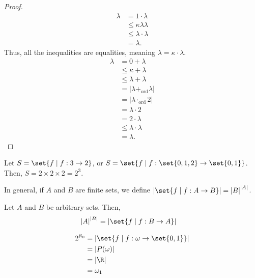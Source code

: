 \documentclass[10pt]{mypackage}
\begin{document}
\begin{proof}
  \begin{align*}
    \lambda &= 1\cdot \lambda\tag*{Needs proof.}\\
            &\leq \kappa\lambda \lambda\\
            &\leq \lambda\cdot \lambda\\
            &= \lambda.
  \end{align*}
  Thus, all the inequalities are equalities, meaning $\lambda = \kappa\cdot\lambda$.
  \begin{align*}
    \lambda &= 0 + \lambda\\
            &\leq \kappa + \lambda\\
            &\leq \lambda + \lambda\\
            &= \left\vert \lambda+_{\text{ord}} \lambda\right\vert\\
            &= \left\vert \lambda\cdot_{\text{ord}} 2 \right\vert\\
            &= \lambda \cdot 2\\
            &= 2\cdot \lambda\\
            &\leq \lambda \cdot \lambda\\
            &= \lambda.
  \end{align*}
\end{proof}
\begin{example}
  Let $S = \set{f\mid f: 3\rightarrow 2}$, or $S = \set{f\mid f: \set{0,1,2}\rightarrow \set{0,1}}$. Then, $S = 2\times2\times 2 = 2^3$.\newline

  In general, if $A$ and $B$ are finite sets, we define $\left\vert \set{f\mid f: A\rightarrow B} \right\vert = \left\vert B \right\vert^{\left\vert A \right\vert}$.
\end{example}
\begin{definition}
  Let $A$ and $B$ be arbitrary sets. Then,
  \begin{align*}
    \left\vert A \right\vert^{\left\vert B \right\vert} &= \left\vert \set{f\mid f: B\rightarrow A}\right\vert
  \end{align*}
\end{definition}
\begin{example}
  \begin{align*}
    2^{\aleph_0} &= \left\vert \set{f\mid f: \omega \rightarrow \set{0,1}} \right\vert\\
                 &= \left\vert P(\omega) \right\vert\\
                 &= \left\vert \R \right\vert\\
                 &= \omega_1
  \end{align*}
\end{example}
\end{document}
